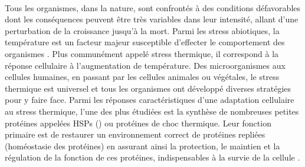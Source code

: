 

\paragraph*{} %
\label{par:intro1}

Tous les organismes, dans la nature, sont confrontés à des conditions défavorables dont les conséquences peuvent être très variables dans leur intensité, allant d'une perturbation de la croissance jusqu'à la mort.
Parmi les stress abiotiques, la température est un facteur majeur susceptible d'effecter le comportement des organismes \cite{ecoloboek}.
Plus communément appelé stress thermique, il correspond à la réponse cellulaire à l'augmentation de température.
Des microorganismes aux cellules humaines, en passant par les cellules animales ou végétales, le stress thermique est universel et tous les organismes ont développé diverses stratégies pour y faire face.
Parmi les réponses caractéristiques d'une adaptation cellulaire au stress thermique, l'une des plus étudiées est la synthèse de nombreuses petites protéines appelées HSPs () ou protéines de choc thermique.
Leur fonction primaire est de restaurer un environnement correct de protéines repliées (homéostasie des protéines) en assurant ainsi la protection, le maintien et la régulation de la fonction de ces protéines, indispensables à la  survie de la cellule \cite{lindquist1988}.


